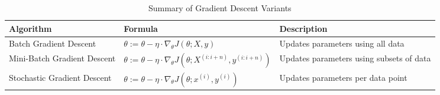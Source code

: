 \begin{table}[htb!]
\caption{Summary of Gradient Descent Variants}
\label{Tables:GradientDescent}
\centering
\footnotesize
\begin{tabularx}{\textwidth}{@{}lXl@{}}
\toprule
\textbf{Algorithm} & \textbf{Formula} & \textbf{Description} \\
\midrule
Batch Gradient Descent & \(\theta := \theta - \eta \cdot \nabla_{\theta} J(\theta; X, y)\) & Updates parameters using all data \\
\addlinespace
Mini-Batch Gradient Descent & \(\theta := \theta - \eta \cdot \nabla_{\theta} J(\theta; X^{(i:i+n)}, y^{(i:i+n)})\) & Updates parameters using subsets of data \\
\addlinespace
Stochastic Gradient Descent & \(\theta := \theta - \eta \cdot \nabla_{\theta} J(\theta; x^{(i)}, y^{(i)})\) & Updates parameters per data point \\
\bottomrule
\end{tabularx}
\end{table}
